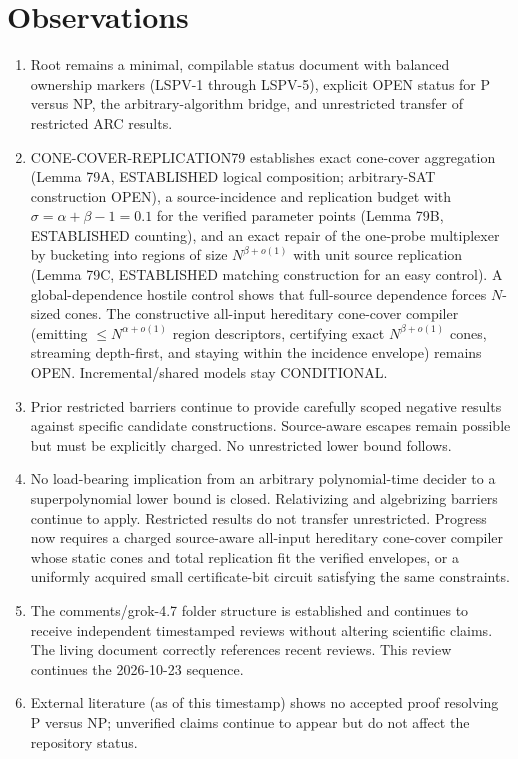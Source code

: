 \documentclass[11pt]{article}
\begin{document}
\section{Observations}
\begin{enumerate}
\item Root  remains a minimal, compilable status document with balanced ownership markers (LSPV-1 through LSPV-5), explicit OPEN status for P versus NP, the arbitrary-algorithm bridge, and unrestricted transfer of restricted ARC results.
\item CONE-COVER-REPLICATION79 establishes exact cone-cover aggregation (Lemma 79A, ESTABLISHED logical composition; arbitrary-SAT construction OPEN), a source-incidence and replication budget with $\sigma=\alpha+\beta-1=0.1$ for the verified parameter points (Lemma 79B, ESTABLISHED counting), and an exact repair of the one-probe multiplexer by bucketing into regions of size $N^{\beta+o(1)}$ with unit source replication (Lemma 79C, ESTABLISHED matching construction for an easy control). A global-dependence hostile control shows that full-source dependence forces $N$-sized cones. The constructive all-input hereditary cone-cover compiler (emitting $\le N^{\alpha+o(1)}$ region descriptors, certifying exact $N^{\beta+o(1)}$ cones, streaming depth-first, and staying within the incidence envelope) remains OPEN. Incremental/shared models stay CONDITIONAL.
\item Prior restricted barriers continue to provide carefully scoped negative results against specific candidate constructions. Source-aware escapes remain possible but must be explicitly charged. No unrestricted lower bound follows.
\item No load-bearing implication from an arbitrary polynomial-time decider to a superpolynomial lower bound is closed. Relativizing and algebrizing barriers continue to apply. Restricted results do not transfer unrestricted. Progress now requires a charged source-aware all-input hereditary cone-cover compiler whose static cones and total replication fit the verified envelopes, or a uniformly acquired small certificate-bit circuit satisfying the same constraints.
\item The comments/grok-4.7 folder structure is established and continues to receive independent timestamped reviews without altering scientific claims. The living document correctly references recent reviews. This review continues the 2026-10-23 sequence.
\item External literature (as of this timestamp) shows no accepted proof resolving P versus NP; unverified claims continue to appear but do not affect the repository status.
\end{enumerate}
\end{document}
